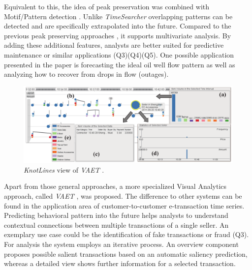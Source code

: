 \documentclass[electronic]{vgtc}             %
\begin{document}
Equivalent to this, the idea of peak preservation \cite{Hao:2009, Hao:2011} was combined with Motif/Pattern detection \cite{Hao:2012}.
Unlike \textit{TimeSearcher} \cite{buono:2007} overlapping patterns can be detected and are specifically extrapolated into the future.
Compared to the previous peak preserving approaches \cite{Hao:2009, Hao:2011}, it supports multivariate analysis. 
By adding these additional features, analysts are better suited for predictive maintenance or similar applications (Q3)(Q4)(Q5). 
One possible application presented in the paper is forecasting the ideal oil well flow pattern as well as analyzing how to recover from drops in flow (outages).   
\begin{figure}[!b]
	\centering
	\includegraphics[width=\columnwidth]{KnotLines}
	\caption{\textit{KnotLines} view of \textit{VAET} \cite{Xie:2014}. 
	}
	\label{fig:knotlines}
\end{figure}
Apart from those general approaches, a more specialized Visual Analytics approach, called \textit{VAET} \cite{Xie:2014}, was proposed.
The difference to other systems can be found in the application area of customer-to-customer e-transaction time series.
Predicting behavioral pattern into the future helps analysts to understand contextual connections between multiple transactions of a single seller.
An exemplary use case could be the identification of fake transactions or fraud (Q3).
For analysis the system employs an iterative process.
An overview component proposes possible salient transactions based on an automatic saliency prediction, whereas a detailed view shows further information for a selected transaction.
\end{document}
